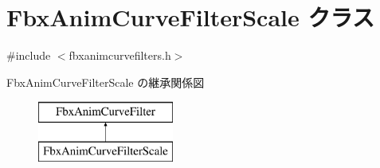 \hypertarget{class_fbx_anim_curve_filter_scale}{}\section{Fbx\+Anim\+Curve\+Filter\+Scale クラス}
\label{class_fbx_anim_curve_filter_scale}


{\ttfamily \#include $<$fbxanimcurvefilters.\+h$>$}

Fbx\+Anim\+Curve\+Filter\+Scale の継承関係図\begin{figure}[H]
\begin{center}
\leavevmode
\includegraphics[height=2.000000cm]{class_fbx_anim_curve_filter_scale}
\end{center}
\end{figure}
